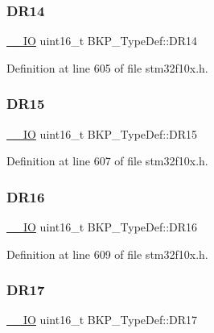 \subsubsection{\texorpdfstring{D\+R14}{DR14}}
{\footnotesize\ttfamily \hyperlink{core__sc300_8h_aec43007d9998a0a0e01faede4133d6be}{\+\_\+\+\_\+\+IO} uint16\+\_\+t B\+K\+P\+\_\+\+Type\+Def\+::\+D\+R14}



Definition at line 605 of file stm32f10x.\+h.

\mbox{\label{struct_b_k_p___type_def_accafac1f65c5eb8f63d5a98ee8173ab3}} 
\subsubsection{\texorpdfstring{D\+R15}{DR15}}
{\footnotesize\ttfamily \hyperlink{core__sc300_8h_aec43007d9998a0a0e01faede4133d6be}{\+\_\+\+\_\+\+IO} uint16\+\_\+t B\+K\+P\+\_\+\+Type\+Def\+::\+D\+R15}



Definition at line 607 of file stm32f10x.\+h.

\mbox{\label{struct_b_k_p___type_def_a2824f0970d27bb9edf16075ac54fae23}} 
\subsubsection{\texorpdfstring{D\+R16}{DR16}}
{\footnotesize\ttfamily \hyperlink{core__sc300_8h_aec43007d9998a0a0e01faede4133d6be}{\+\_\+\+\_\+\+IO} uint16\+\_\+t B\+K\+P\+\_\+\+Type\+Def\+::\+D\+R16}



Definition at line 609 of file stm32f10x.\+h.

\mbox{\label{struct_b_k_p___type_def_a78b37ff2fb91c016b8436f1218b10a4f}} 
\subsubsection{\texorpdfstring{D\+R17}{DR17}}
{\footnotesize\ttfamily \hyperlink{core__sc300_8h_aec43007d9998a0a0e01faede4133d6be}{\+\_\+\+\_\+\+IO} uint16\+\_\+t B\+K\+P\+\_\+\+Type\+Def\+::\+D\+R17}



